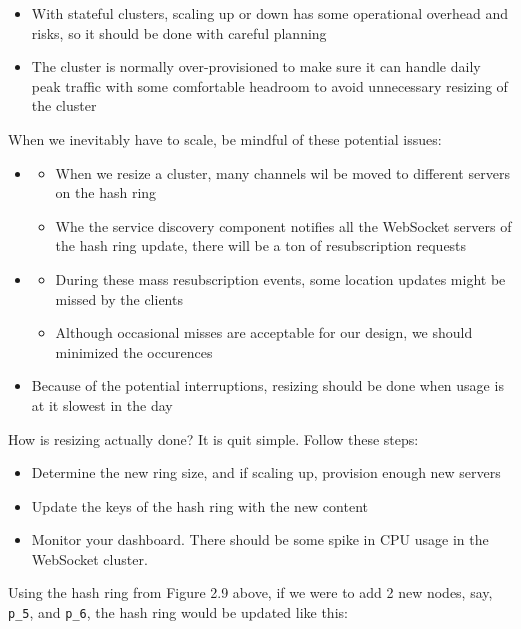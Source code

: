 \documentclass{report}
\theoremstyle{definition}
\begin{document}
\begin{itemize}
\item
With stateful clusters, scaling up or down has some operational overhead and risks, so it should be done with careful planning
\item
The cluster is normally over-provisioned to make sure it can handle daily peak traffic with some comfortable headroom to avoid unnecessary resizing of the cluster
\end{itemize}

When we inevitably have to scale, be mindful of these potential issues:

\begin{itemize}
\item

\begin{itemize}
\item
When we resize a cluster, many channels wil be moved to different servers on the hash ring
\item
Whe the service discovery component notifies all the WebSocket servers of the hash ring update, there will be a ton of resubscription requests
\end{itemize}

\item

\begin{itemize}
\item
During these mass resubscription events, some location updates might be missed by the clients
\item
Although occasional misses are acceptable for our design, we should minimized the occurences
\end{itemize}
\item
Because of the potential interruptions, resizing should be done when usage is at it slowest in the day
\end{itemize}

How is resizing actually done? It is quit simple. Follow these steps:
\begin{itemize}
\item
Determine the new ring size, and if scaling up, provision enough new servers
\item
Update the keys of the hash ring with the new content
\item
Monitor your dashboard. There should be some spike in CPU usage in the WebSocket cluster.
\end{itemize}

Using the hash ring from Figure 2.9 above, if we were to add 2 new nodes, say, \lstinline|p_5|, and \lstinline|p_6|, the hash
ring would be updated like this:
\end{document}
